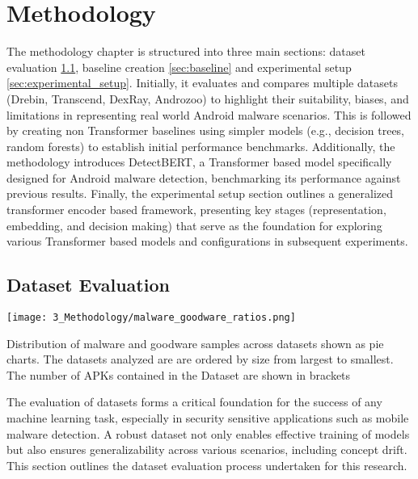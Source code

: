 \chapter{Methodology} %

\label{Methodology} %

The methodology chapter is structured into three main sections: 
dataset evaluation \ref{sec:datasets}, baseline creation \ref{sec:baseline} 
and experimental setup \ref{sec:experimental_setup}. 
Initially, it evaluates and compares multiple datasets (Drebin, Transcend, DexRay, Androzoo) to highlight their suitability, 
biases, and limitations in representing real world Android malware scenarios. 
This is followed by creating non Transformer baselines using simpler models (e.g., decision trees, random forests) 
to establish initial performance benchmarks. 
Additionally, the methodology introduces DetectBERT, 
a Transformer based model specifically designed for Android malware detection, 
benchmarking its performance against previous results. 
Finally, the experimental setup section outlines a generalized transformer encoder based framework, 
presenting key stages (representation, embedding, and decision making) 
that serve as the foundation for exploring various Transformer based models and 
configurations in subsequent experiments.

\section{Dataset Evaluation}
\label{sec:datasets}

\begin{marginfigure}[] %
    \texttt{[image: 3\_Methodology/malware\_goodware\_ratios.png]}
    \caption{\label{fig:malratios}
    Distribution of malware and goodware samples across datasets shown as pie charts.
    The datasets analyzed are are ordered by size from largest to smallest.
    The number of APKs contained in the Dataset are shown in brackets}
\end{marginfigure}

The evaluation of datasets forms a critical foundation for the success of any machine learning task, 
especially in security sensitive applications such as mobile malware detection. 
A robust dataset not only enables effective training of models but also ensures generalizability 
across various scenarios, including concept drift. 
This section outlines the dataset evaluation process undertaken for this research.

